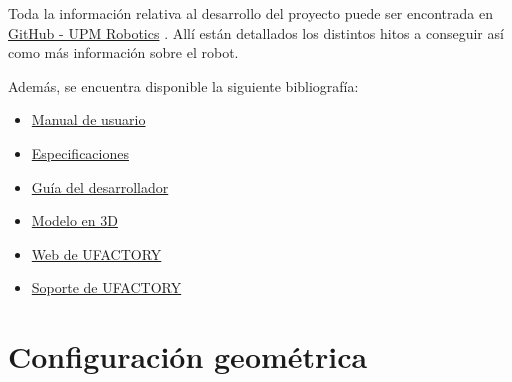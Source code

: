 \documentclass[a4paper,12pt]{article}
\begin{document}
\newpage
Toda la información relativa al desarrollo del proyecto puede ser encontrada en
\href{https://github.com/UPM-Robotics/uarm}{GitHub - UPM Robotics} \cite{noauthor_upm-robotics/uarm_2019}. Allí están detallados
los distintos hitos a conseguir así como más información sobre el robot.

Además, se encuentra disponible la siguiente bibliografía:
\begin{itemize}
    \item \href{https://github.com/UPM-Robotics/uarm/blob/master/docs/robot-information/uArm%20pro%20User%20Manual%20v1.1.0.pdf}{Manual de usuario}
    \item \href{https://github.com/UPM-Robotics/uarm/blob/master/docs/robot-information/uArm-Swift-Specifications-171012.pdf}{Especificaciones}
    \item \href{https://github.com/UPM-Robotics/uarm/blob/master/docs/robot-information/uArm%20Swift%20Pro_Developer%20Guide%20v1.0.6.pdf}{Guía del desarrollador}
    \item \href{https://github.com/UPM-Robotics/uarm/blob/master/docs/robot-information/uArm_Swift_Pro_3D_20180620.STEP}{Modelo en 3D}
    \item \href{https://www.ufactory.cc/#/en/}{Web de UFACTORY}
    \item \href{https://www.ufactory.cc/#/en/support/technology}{Soporte de UFACTORY}
\end{itemize}

\newpage
\section{Configuración geométrica}
\label{sec:dk}
\end{document}
